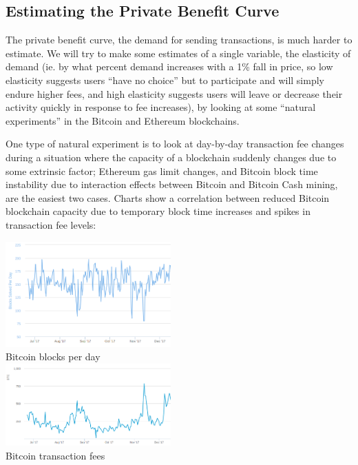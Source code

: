 \documentclass[12pt, final]{article}
\begin{document}
\subsection{Estimating the Private Benefit Curve}

The private benefit curve, the demand for sending transactions, is much harder to estimate. We will try to make some estimates of a single variable, the elasticity of demand (ie. by what percent demand increases with a 1\% fall in price, so low elasticity suggests users ``have no choice'' but to participate and will simply endure higher fees, and high elasticity suggests users will leave or decrease their activity quickly in response to fee increases), by looking at some ``natural experiments'' in the Bitcoin and Ethereum blockchains.

One type of natural experiment is to look at day-by-day transaction fee changes during a situation where the capacity of a blockchain suddenly changes due to some extrinsic factor; Ethereum gas limit changes, and Bitcoin block time instability due to interaction effects between Bitcoin and Bitcoin Cash mining, are the easiest two cases. Charts show a correlation between reduced Bitcoin blockchain capacity due to temporary block time increases and spikes in transaction fee levels:

\begin{center}
\includegraphics[width=2.5in]{bitcoin1.png} \\
Bitcoin blocks per day \\
\includegraphics[width=2.5in]{bitcoin2.png} \\
Bitcoin transaction fees
\label{fig:three}
\end{center}
\end{document}
